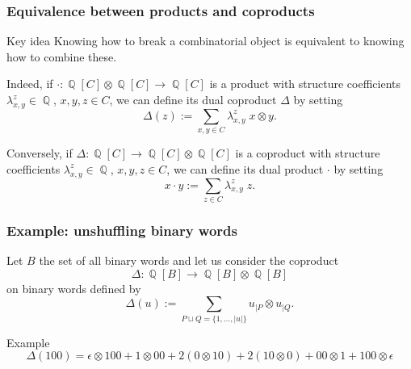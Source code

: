\documentclass[unknownkeysallowed,10pt,xcolor={dvipsnames}]{beamer}
\DeclareMathOperator{\QQ}{\mathbb{Q}}
\begin{document}
\begin{frame} \frametitle{Equivalence between products and coproducts}
\begin{block}{Key idea}
    Knowing how to break a combinatorial object is equivalent
    to knowing how to combine these.
\end{block}
\medskip

Indeed, if $\cdot : \QQ[C] \otimes \QQ[C] \to \QQ[C]$ is a product with
structure coefficients $\lambda_{x, y}^z \in \QQ$, $x, y, z \in C$,
we can define its \alert{dual coproduct} $\Delta$ by setting
\begin{equation*}
    \Delta(z) := \sum_{x, y \in C}  \lambda_{x, y}^z \;  x \otimes y.
\end{equation*}
\medskip

Conversely, if $\Delta : \QQ[C] \to \QQ[C] \otimes \QQ[C]$ is
a coproduct with structure coefficients $\lambda_{x, y}^z \in \QQ$,
$x, y, z \in C$, we can define its \alert{dual product} $\cdot$ by
setting
\begin{equation*}
    x \cdot y := \sum_{z \in C} \lambda_{x, y}^z \; z.
\end{equation*}
\end{frame}

\begin{frame} \frametitle{Example: unshuffling binary words}
Let $B$ the set of all binary words and let us consider the coproduct
\begin{equation*}
    \Delta : \QQ[B] \to \QQ[B] \otimes \QQ[B]
\end{equation*}
on binary words defined by
\begin{equation*}
    \Delta(u) :=
    \sum_{P \sqcup Q = \{1, \dots, |u|\}}
    u_{|P} \otimes u_{|Q}.
\end{equation*}

\begin{block}{Example}
\begin{equation*}
    \Delta(100) =
    \epsilon \otimes 100 + 1 \otimes 00
    + 2 (0 \otimes 10) + 2 (10 \otimes 0) + 00 \otimes 1
    + 100 \otimes \epsilon
\end{equation*}
\end{block}
\end{frame}
\end{document}
